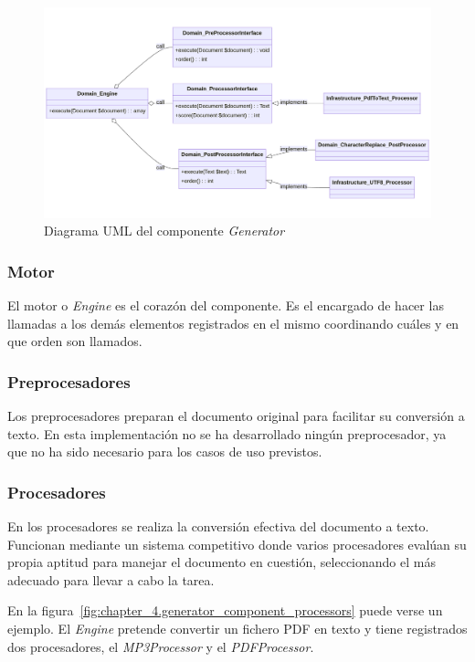 \begin{figure}[ht]
    \begin{center}
        \includegraphics[width=\textwidth]{./chapter/4/images/chapter_4.generator_component_uml}
        \caption{Diagrama UML del componente \textit{Generator}}
        \label{fig:chapter_4.generator_component_uml}
    \end{center}
\end{figure}

\subsubsection*{Motor}
El motor o \textit{Engine} es el corazón del componente.
Es el encargado de hacer las llamadas a los demás elementos registrados en el mismo coordinando cuáles y en que
orden son llamados.

\subsubsection*{Preprocesadores}
Los preprocesadores preparan el documento original para facilitar su conversión a texto.
En esta implementación no se ha desarrollado ningún preprocesador, ya que no ha sido necesario para los casos de uso
previstos.

\subsubsection*{Procesadores}
En los procesadores se realiza la conversión efectiva del documento a texto.
Funcionan mediante un sistema competitivo donde varios procesadores evalúan su propia aptitud para manejar el documento
en cuestión, seleccionando el más adecuado para llevar a cabo la tarea.

En la figura~\ref{fig:chapter_4.generator_component_processors} puede verse un ejemplo.
El \textit{Engine} pretende convertir un fichero PDF en texto y tiene registrados dos procesadores, el
\textit{MP3Processor} y el \textit{PDFProcessor}.

